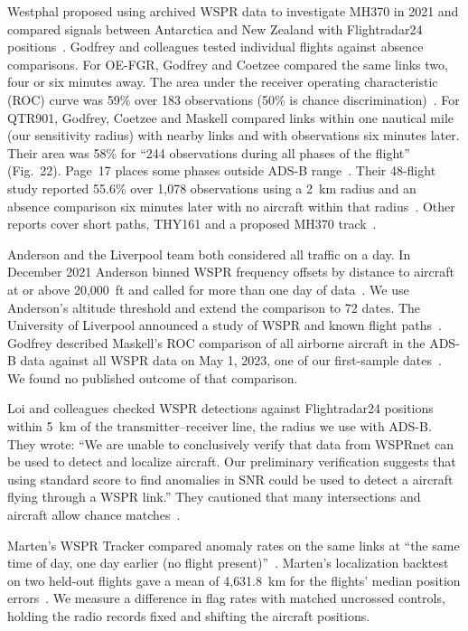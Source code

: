 \documentclass[11pt]{article}
\begin{document}
Westphal proposed using archived WSPR data to investigate MH370 in 2021 and compared signals between Antarctica and New Zealand with Flightradar24 positions~\cite{westphal2021}. Godfrey and colleagues tested individual flights against absence comparisons. For OE-FGR, Godfrey and Coetzee compared the same links two, four or six minutes away. The area under the receiver operating characteristic (ROC) curve was 59\% over 183 observations (50\% is chance discrimination)~\cite{oefgrpdf}. For QTR901, Godfrey, Coetzee and Maskell compared links within one nautical mile (our sensitivity radius) with nearby links and with observations six minutes later. Their area was 58\% for ``244 observations during all phases of the flight'' (Fig.~22). Page~17 places some phases outside ADS-B range~\cite{qtr901pdf}. Their 48-flight study reported 55.6\% over 1{,}078 observations using a 2~km radius and an absence comparison six minutes later with no aircraft within that radius~\cite{gpr}. Other reports cover short paths, THY161 and a proposed MH370 track~\cite{wsprradar,shortdist,thy161,mh370fpa}.

Anderson and the Liverpool team both considered all traffic on a day. In December 2021 Anderson binned WSPR frequency offsets by distance to aircraft at or above 20{,}000~ft and called for more than one day of data~\cite{anderson}. We use Anderson's altitude threshold and extend the comparison to 72 dates. The University of Liverpool announced a study of WSPR and known flight paths~\cite{liverpool}. Godfrey described Maskell's ROC comparison of all airborne aircraft in the ADS-B data against all WSPR data on May 1, 2023, one of our first-sample dates~\cite{liverpooldesign}. We found no published outcome of that comparison.

Loi and colleagues checked WSPR detections against Flightradar24 positions within 5~km of the transmitter--receiver line, the radius we use with ADS-B. They wrote: ``We are unable to conclusively verify that data from WSPRnet can be used to detect and localize aircraft. Our preliminary verification suggests that using standard score to find anomalies in SNR could be used to detect a aircraft flying through a WSPR link.'' They cautioned that many intersections and aircraft allow chance matches~\cite{loi}.

Marten's WSPR Tracker compared anomaly rates on the same links at ``the same time of day, one day earlier (no flight present)''~\cite{martencontrol}. Marten's localization backtest on two held-out flights gave a mean of 4{,}631.8~km for the flights' median position errors~\cite{marten}. We measure a difference in flag rates with matched uncrossed controls, holding the radio records fixed and shifting the aircraft positions.
\end{document}
